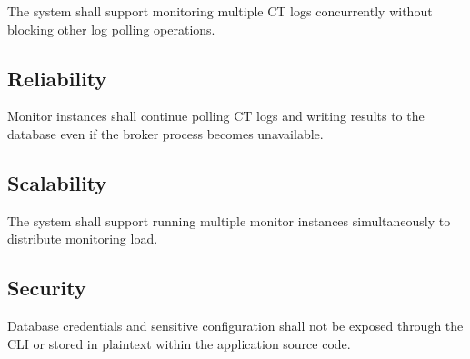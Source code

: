 \documentclass{article}
\begin{document}
The system shall support monitoring multiple CT logs concurrently without 
blocking other log polling operations.

\subsection{Reliability}

Monitor instances shall continue polling CT logs and writing results to the 
database even if the broker process becomes unavailable.

\subsection{Scalability}

The system shall support running multiple monitor instances simultaneously to 
distribute monitoring load.

\subsection{Security}

Database credentials and sensitive configuration shall not be exposed through 
the CLI or stored in plaintext within the application source code.
\end{document}
